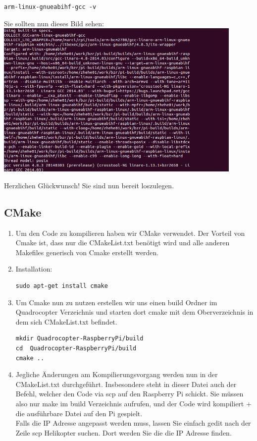 \documentclass{article}
\begin{document}
\begin{enumerate}
\begin{verbatim}
arm-linux-gnueabihf-gcc -v
\end{verbatim}

Sie sollten nun dieses Bild sehen:\\
\includegraphics[width=0.9\textwidth]{graphics/arm.png}
\end{enumerate}

Herzlichen Glückwunsch! Sie sind nun bereit loszulegen.

\subsection{CMake}

\begin{enumerate}
\item[] Um den Code zu kompilieren haben wir CMake verwendet. Der Vorteil von Cmake ist, dass nur die CMakeList.txt benötigt wird und alle anderen Makefiles generisch von Cmake erstellt werden.\\

\item Installation:

\begin{verbatim}
sudo apt-get install cmake
\end{verbatim}

\item Um Cmake nun zu nutzen erstellen wir uns einen build Ordner im Quadrocopter Verzeichnis und starten dort cmake mit dem Oberverzeichnis in dem sich CMakeList.txt befindet.

\begin{verbatim}
mkdir Quadrocopter-RaspberryPi/build
cd  Quadrocopter-RaspberryPi/build
cmake ..
\end{verbatim}
\item Jegliche Änderungen am Kompilierungsvorgang werden nun in der CMakeList.txt durchgeführt. Insbesondere steht in dieser Datei auch der Befehl, welcher den Code via scp auf den Raspberry Pi schickt.
Sie müssen also nur make im build Verzeichnis aufrufen, und der Code wird kompiliert + die ausführbare Datei auf den Pi gespielt.\\
Falls die IP Adresse angepasst werden muss, lassen Sie einfach gedit nach der Zeile scp Helikopter suchen. Dort werden Sie die die IP Adresse finden.\\

\end{enumerate}
\end{document}
